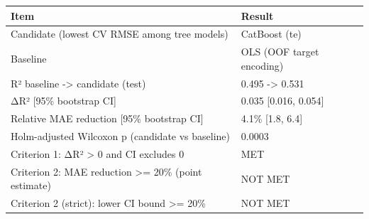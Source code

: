\begin{tabular}{ll}
\toprule
Item & Result \\
\midrule
Candidate (lowest CV RMSE among tree models) & CatBoost (te) \\
Baseline & OLS (OOF target encoding) \\
R² baseline -> candidate (test) & 0.495 -> 0.531 \\
ΔR² [95\% bootstrap CI] & 0.035 [0.016, 0.054] \\
Relative MAE reduction [95\% bootstrap CI] & 4.1\% [1.8, 6.4] \\
Holm-adjusted Wilcoxon p (candidate vs baseline) & 0.0003 \\
Criterion 1: ΔR² > 0 and CI excludes 0 & MET \\
Criterion 2: MAE reduction >= 20\% (point estimate) & NOT MET \\
Criterion 2 (strict): lower CI bound >= 20\% & NOT MET \\
\bottomrule
\end{tabular}
